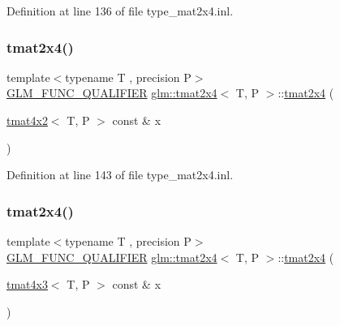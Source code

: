 Definition at line 136 of file type\+\_\+mat2x4.\+inl.

\mbox{\label{structglm_1_1tmat2x4_a871b56fba1a79bfe5b48920c388ef607}} 
\subsubsection{\texorpdfstring{tmat2x4()}{tmat2x4()}\hspace{0.1cm}{\footnotesize\ttfamily [17/22]}}
{\footnotesize\ttfamily template$<$typename T , precision P$>$ \\
\mbox{\hyperlink{setup_8hpp_a33fdea6f91c5f834105f7415e2a64407}{G\+L\+M\+\_\+\+F\+U\+N\+C\+\_\+\+Q\+U\+A\+L\+I\+F\+I\+ER}} \mbox{\hyperlink{structglm_1_1tmat2x4}{glm\+::tmat2x4}}$<$ T, P $>$\+::\mbox{\hyperlink{structglm_1_1tmat2x4}{tmat2x4}} (\begin{DoxyParamCaption}\item[{\mbox{\hyperlink{structglm_1_1tmat4x2}{tmat4x2}}$<$ T, P $>$ const \&}]{x }\end{DoxyParamCaption})}



Definition at line 143 of file type\+\_\+mat2x4.\+inl.

\mbox{\label{structglm_1_1tmat2x4_ae3ecb4edcc52b02b181e07a44d0511c8}} 
\subsubsection{\texorpdfstring{tmat2x4()}{tmat2x4()}\hspace{0.1cm}{\footnotesize\ttfamily [18/22]}}
{\footnotesize\ttfamily template$<$typename T , precision P$>$ \\
\mbox{\hyperlink{setup_8hpp_a33fdea6f91c5f834105f7415e2a64407}{G\+L\+M\+\_\+\+F\+U\+N\+C\+\_\+\+Q\+U\+A\+L\+I\+F\+I\+ER}} \mbox{\hyperlink{structglm_1_1tmat2x4}{glm\+::tmat2x4}}$<$ T, P $>$\+::\mbox{\hyperlink{structglm_1_1tmat2x4}{tmat2x4}} (\begin{DoxyParamCaption}\item[{\mbox{\hyperlink{structglm_1_1tmat4x3}{tmat4x3}}$<$ T, P $>$ const \&}]{x }\end{DoxyParamCaption})}



